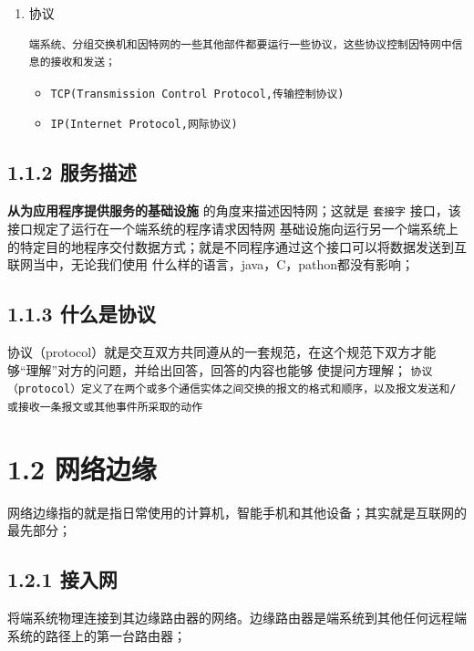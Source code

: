 \documentclass[11pt]{article}
\begin{document}
\begin{enumerate}
\item 协议
\begin{verbatim}
端系统、分组交换机和因特网的一些其他部件都要运行一些协议，这些协议控制因特网中信息的接收和发送；
\end{verbatim}

\begin{itemize}
\item \texttt{TCP(Transmission Control Protocol,传输控制协议)}
\item \texttt{IP(Internet Protocol,网际协议)}
\end{itemize}
\end{enumerate}











\subsection{1.1.2 服务描述}
\label{sec:org70de470}
\textbf{从为应用程序提供服务的基础设施} 的角度来描述因特网；这就是 \texttt{套接字} 接口，该接口规定了运行在一个端系统的程序请求因特网
基础设施向运行另一个端系统上的特定目的地程序交付数据方式；就是不同程序通过这个接口可以将数据发送到互联网当中，无论我们使用
什么样的语言，java，C，pathon都没有影响；

\subsection{1.1.3 什么是协议}
\label{sec:org3ec6f61}
协议（protocol）就是交互双方共同遵从的一套规范，在这个规范下双方才能够“理解”对方的问题，并给出回答，回答的内容也能够
使提问方理解；
\texttt{协议（protocol）定义了在两个或多个通信实体之间交换的报文的格式和顺序，以及报文发送和/或接收一条报文或其他事件所采取的动作}


\section{1.2 网络边缘}
\label{sec:orgcfdd8cb}

网络边缘指的就是指日常使用的计算机，智能手机和其他设备；其实就是互联网的最先部分；

\subsection{1.2.1 接入网}
\label{sec:org408bef3}
将端系统物理连接到其边缘路由器的网络。边缘路由器是端系统到其他任何远程端系统的路径上的第一台路由器；
\end{document}
